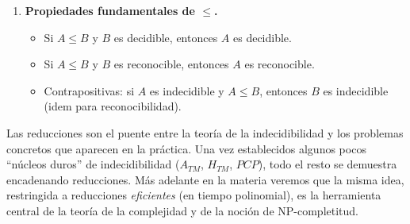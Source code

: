 \documentclass[11pt,a4paper]{article}
\theoremstyle{definicion}
\begin{document}
\begin{enumerate}
    \item \textbf{Propiedades fundamentales de $\leq$.}
    \begin{itemize}
        \item Si $A \leq B$ y $B$ es decidible, entonces $A$ es decidible.
        \item Si $A \leq B$ y $B$ es reconocible, entonces $A$ es reconocible.
        \item Contrapositivas: si $A$ es indecidible y $A \leq B$, entonces $B$ es indecidible (idem para reconocibilidad).
    \end{itemize}
\end{enumerate}

\begin{intuicion}
Las reducciones son el puente entre la teoría de la indecidibilidad y los problemas concretos que aparecen en la práctica. Una vez establecidos algunos pocos ``núcleos duros'' de indecidibilidad ($A_{TM}$, $H_{TM}$, $PCP$), todo el resto se demuestra encadenando reducciones. Más adelante en la materia veremos que la misma idea, restringida a reducciones \emph{eficientes} (en tiempo polinomial), es la herramienta central de la teoría de la complejidad y de la noción de NP-completitud.
\end{intuicion}
\end{document}
